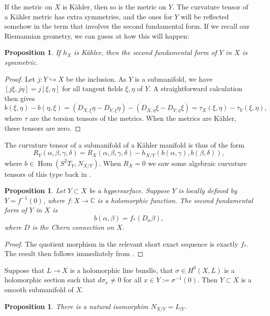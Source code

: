 \documentclass[11pt]{article}
\newtheorem{prop}[theo]{Proposition}
\newtheorem*{proof}{Proof}
\newcommand{\kk}[1]{\mathbb{#1}}
\DeclareMathOperator{\Hom}{Hom}
\begin{document}
If the metric on $X$ is K\"ahler, then so is the metric on $Y$. The curvature tensor of a K\"ahler metric has extra symmetries, and the ones for $Y$ will be reflected somehow in the term that involves the second fundamental form. If we recall our Riemannian geometry, we can guess at how this will happen:

\begin{prop}
If $h_X$ is K\"ahler, then the second fundamental form of $Y$ in $X$ is symmetric.
\end{prop}

\begin{proof}
Let $j : Y \hookrightarrow X$ be the inclusion. As $Y$ is a submanifold, we have $[j\xi,j\eta] = j[\xi,\eta]$ for all tangent fields $\xi,\eta$ of $Y$. A straightforward calculation then gives
\[
b(\xi,\eta) - b(\eta,\xi)
= (D_{X,\xi}\eta - D_{Y,\xi}\eta)
- (D_{X,\eta}\xi - D_{Y,\eta}\xi)
= \tau_X(\xi,\eta) - \tau_Y(\xi,\eta),
\]
where $\tau$ are the torsion tensors of the metrics. When the metrics are K\"ahler, these tensors are zero.
\end{proof}

The curvature tensor of a submanifold of a K\"ahler manifold is thus of the form
\[
R_Y(\alpha,\beta,\gamma,\delta)
= R_X(\alpha,\beta,\gamma,\delta)
- h_{X/Y}(b(\alpha,\gamma), b(\beta,\delta)),
\]
where $b \in \Hom(S^2 T_Y, N_{X/Y})$. When $R_X = 0$ we saw some algebraic curvature tensors of this type back in .



\begin{prop}
Let $Y \subset X$ be a hypersurface. Suppose $Y$ is locally defined by $Y = f^{-1}(0)$, where $f : X \to \kk C$ is a holomorphic function. The second fundamental form of $Y$ in $X$ is
\[
b(\alpha,\beta) = f_*(D_\alpha \beta),
\]
where $D$ is the Chern connection on $X$.
\end{prop}

\begin{proof}
The quotient morphism in the relevant short exact sequence is exactly $f_*$. The result then follows immediately from .
\end{proof}


Suppose that $L \to X$ is a holomorphic line bundle, that $\sigma \in H^0(X,L)$ is a holomorphic section such that $d\sigma_x \not= 0$ for all $x \in Y := \sigma^{-1}(0)$. Then $Y \subset X$ is a smooth submanifold of $X$.

\begin{prop}
There is a natural isomorphim $N_{X/Y} = L_{|Y}$.
\end{prop}
\end{document}
